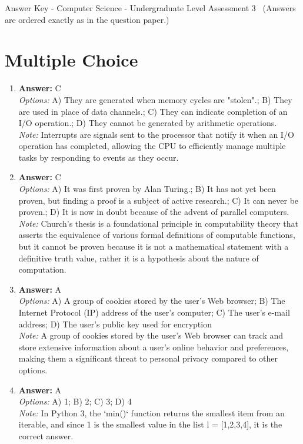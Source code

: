 \documentclass[12pt]{article}
\begin{document}
\begin{center}
Answer Key - Computer Science - Undergraduate Level Assessment 3 \
\small (Answers are ordered exactly as in the question paper.)
\end{center}

\section*{Multiple Choice}
\begin{enumerate}[label=\arabic*.]
\item \textbf{Answer:} C
\\ \textit{Options:} A) They are generated when memory cycles are "stolen".; B) They are used in place of data channels.; C) They can indicate completion of an I/O operation.; D) They cannot be generated by arithmetic operations.
\\ \textit{Note:} Interrupts are signals sent to the processor that notify it when an I/O operation has completed, allowing the CPU to efficiently manage multiple tasks by responding to events as they occur.
\item \textbf{Answer:} C
\\ \textit{Options:} A) It was first proven by Alan Turing.; B) It has not yet been proven, but finding a proof is a subject of active research.; C) It can never be proven.; D) It is now in doubt because of the advent of parallel computers.
\\ \textit{Note:} Church's thesis is a foundational principle in computability theory that asserts the equivalence of various formal definitions of computable functions, but it cannot be proven because it is not a mathematical statement with a definitive truth value, rather it is a hypothesis about the nature of computation.
\item \textbf{Answer:} A
\\ \textit{Options:} A) A group of cookies stored by the user's Web browser; B) The Internet Protocol (IP) address of the user's computer; C) The user's e-mail address; D) The user's public key used for encryption
\\ \textit{Note:} A group of cookies stored by the user's Web browser can track and store extensive information about a user's online behavior and preferences, making them a significant threat to personal privacy compared to other options.
\item \textbf{Answer:} A
\\ \textit{Options:} A) 1; B) 2; C) 3; D) 4
\\ \textit{Note:} In Python 3, the `min()` function returns the smallest item from an iterable, and since 1 is the smallest value in the list l = [1,2,3,4], it is the correct answer.

\end{enumerate}
\end{document}
